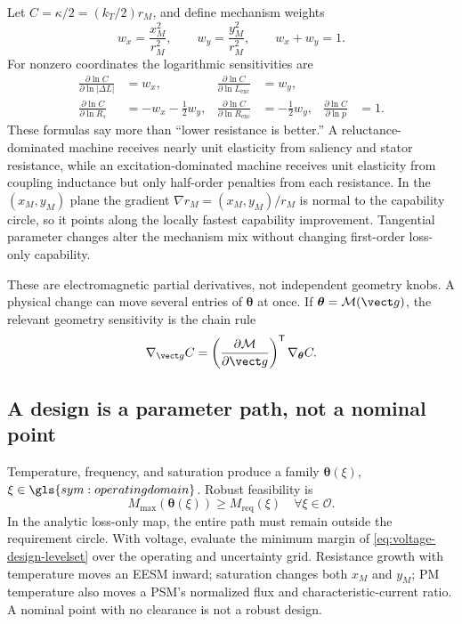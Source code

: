 Let \(C=\kappa/2=(k_T/2)r_M\), and define mechanism weights
\begin{equation}
 w_x=\frac{x_M^2}{r_M^2},\qquad w_y=\frac{y_M^2}{r_M^2},
 \qquad w_x+w_y=1.
\end{equation}
For nonzero coordinates the logarithmic sensitivities are
\begin{align}
 \frac{\partial\ln C}{\partial\ln|\Delta L|}&=w_x,&
 \frac{\partial\ln C}{\partial\ln L_{\mathrm{exc}}}&=w_y,
 \label{eq:capability-elasticity-positive}\\
 \frac{\partial\ln C}{\partial\ln R_s}&=-w_x-\frac12w_y,&
 \frac{\partial\ln C}{\partial\ln R_{\mathrm{exc}}}&=-\frac12w_y,&
 \frac{\partial\ln C}{\partial\ln p}&=1.
 \label{eq:capability-elasticity-cost}
\end{align}
These formulas say more than ``lower resistance is better.''  A
reluctance-dominated machine receives nearly unit elasticity from saliency and
stator resistance, while an excitation-dominated machine receives unit
elasticity from coupling inductance but only half-order penalties from each
resistance.  In the \((x_M,y_M)\) plane the gradient
\(\nabla r_M=(x_M,y_M)/r_M\) is normal to the capability circle, so it points
along the locally fastest capability improvement.  Tangential parameter
changes alter the mechanism mix without changing first-order loss-only
capability.

These are electromagnetic partial derivatives, not independent geometry
knobs.  A physical change can move several entries of \(\boldsymbol\theta\)
at once.  If \(\boldsymbol\theta=\mathcal M(\vect g)\), the relevant geometry
sensitivity is the chain rule
\begin{equation}
 \nabla_{\vect g}C=
 \left(\frac{\partial\mathcal M}{\partial\vect g}\right)^{\mathsf T}
 \nabla_{\boldsymbol\theta}C.
 \label{eq:geometry-chain-rule}
\end{equation}

\subsection{A design is a parameter path, not a nominal point}

Temperature, frequency, and saturation produce a family
\(\boldsymbol\theta(\xi)\), \(\xi\in\gls{sym:operatingdomain}\).  Robust
feasibility is
\begin{equation}
 \boxed{M_{\max}(\boldsymbol\theta(\xi))
 \geq M_{\mathrm{req}}(\xi)\quad\forall\xi\in\mathcal O.}
 \label{eq:robust-design-path}
\end{equation}
In the analytic loss-only map, the entire path must remain outside the
requirement circle.  With voltage, evaluate the minimum margin of
\cref{eq:voltage-design-levelset} over the operating and uncertainty grid.
Resistance growth with temperature moves an EESM inward; saturation changes
both \(x_M\) and \(y_M\); PM temperature also moves a PSM's normalized flux
and characteristic-current ratio.  A nominal point with no clearance is not a
robust design.

